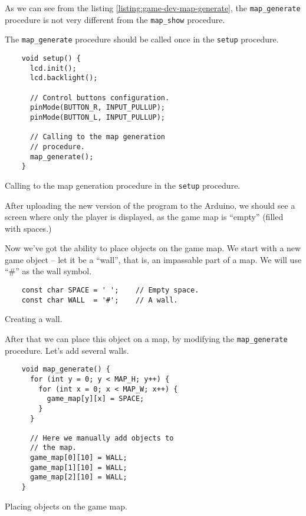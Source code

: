 \documentclass[../sparc.tex]{subfiles}
\begin{document}
As we can see from the listing \ref{listing:game-dev-map-generate}, the
\texttt{map_generate} procedure is not very different from the
\texttt{map_show} procedure.

The \texttt{map_generate} procedure should be called once in the
\texttt{setup} procedure.

\begin{listing}[H]
  \begin{verbatim}
    void setup() {
      lcd.init();
      lcd.backlight();

      // Control buttons configuration.
      pinMode(BUTTON_R, INPUT_PULLUP);
      pinMode(BUTTON_L, INPUT_PULLUP);

      // Calling to the map generation
      // procedure.
      map_generate();
    }
  \end{verbatim}
  \caption{Calling to the map generation procedure in the
    \texttt{setup} procedure.}
  \label{listing:game-dev-map-generate-call}
\end{listing}

After uploading the new version of the program to the Arduino, we should see a
screen where only the player is displayed, as the game map is ``empty'' (filled
with spaces.)

Now we've got the ability to place objects on the game map. We start with a new
game object -- let it be a ``wall'', that is, an impassable part of a map. We
will use ``\#'' as the wall symbol.

\begin{listing}[H]
  \begin{verbatim}
    const char SPACE = ' ';    // Empty space.
    const char WALL  = '#';    // A wall.
  \end{verbatim}
  \caption{Creating a wall.}
  \label{listing:game-dev-map-objects}
\end{listing}

After that we can place this object on a map, by modifying the
\texttt{map_generate} procedure.  Let's add several walls.

\begin{listing}[H]
  \begin{verbatim}
    void map_generate() {
      for (int y = 0; y < MAP_H; y++) {
        for (int x = 0; x < MAP_W; x++) {
          game_map[y][x] = SPACE;
        }
      }

      // Here we manually add objects to
      // the map.
      game_map[0][10] = WALL;
      game_map[1][10] = WALL;
      game_map[2][10] = WALL;
    }
  \end{verbatim}
  \caption{Placing objects on the game map.}
  \label{listing:game-dev-map-objects-set}
\end{listing}
\end{document}
